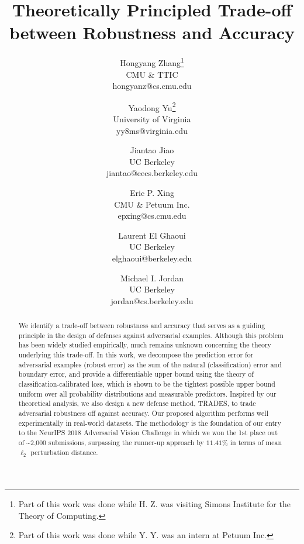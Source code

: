 \documentclass[11pt]{article}
\title{Theoretically Principled Trade-off between Robustness and Accuracy}
\author{
Hongyang Zhang\thanks{Part of this work was done while H. Z. was visiting Simons Institute
for the Theory of Computing.} \\ CMU \& TTIC \\ \small{hongyanz@cs.cmu.edu} \and
Yaodong Yu\thanks{Part of this work was done while Y. Y. was an intern at Petuum Inc.} \\ University of Virginia \\ \small{yy8ms@virginia.edu} \and
Jiantao Jiao \\ UC Berkeley \\
\small{jiantao@eecs.berkeley.edu} \and
Eric P. Xing \\ CMU \& Petuum Inc. \\
\small{epxing@cs.cmu.edu} \and
Laurent El Ghaoui \\ UC Berkeley \\
\small{elghaoui@berkeley.edu} \\ \and
Michael I. Jordan \\ UC Berkeley \\
\small{jordan@cs.berkeley.edu}
}
\date{}
\newcommand{\0}{\mathbf{0}}
\newcommand{\1}{\mathbf{1}}
\begin{document}
\maketitle


\begin{abstract}
We identify a trade-off between robustness and accuracy that serves as a guiding principle in the design of defenses against adversarial examples. Although this problem has been widely studied empirically, much remains unknown concerning the theory underlying this trade-off. In this work, we decompose the prediction error for adversarial examples (robust error) as the sum of the natural (classification) error and boundary error, and provide a differentiable upper bound using the theory of classification-calibrated loss, which is shown to be the tightest possible upper bound uniform over all probability distributions and measurable predictors. Inspired by our theoretical analysis, we also design a new defense method, TRADES, to trade adversarial robustness off against accuracy. Our proposed algorithm performs well experimentally in real-world datasets. The methodology is the foundation of our entry to the NeurIPS 2018 Adversarial Vision Challenge in which we won the 1st place out of \textasciitilde2,000 submissions, surpassing the runner-up approach by $11.41\%$ in terms of mean $\ell_2$ perturbation distance.
\end{abstract}
\end{document}
